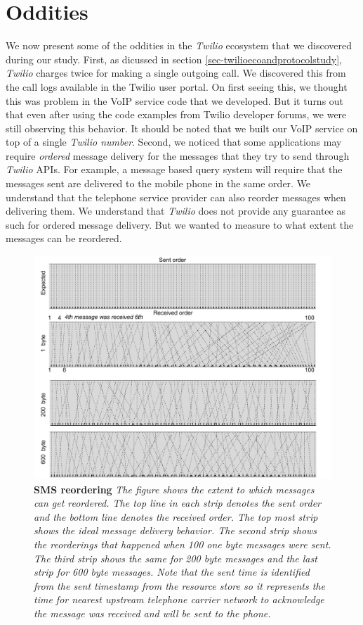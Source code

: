 \section{Oddities}
\label{sec-oddities}

We now present some of the oddities in the \textit{Twilio} ecosystem that we discovered during our study. First, as dicussed in section \ref{sec-twilioecoandprotocolstudy}, \textit{Twilio} charges twice for making a single outgoing call. We discovered this from the call logs available in the Twilio user portal. On first seeing this, we thought this was problem in the VoIP service code that we developed. But it turns out that even after using the code examples from Twilio developer forums, we were still observing this behavior. It should be noted that we built our VoIP service on top of a single \textit{Twilio number}. Second, we noticed that some applications may require \textit{ordered} message delivery for the messages that they try to send through \textit{Twilio} APIs. For example, a message based query system will require that the messages sent are delivered to the mobile phone in the same order. We understand that the telephone service provider can also reorder messages when delivering them. We understand that \textit{Twilio} does not provide any guarantee as such for ordered message delivery. But we wanted to measure to what extent the messages can be reordered. 

\begin{figure}[t!] \centering
\includegraphics[width=\textwidth]{figs/reordering.pdf}
\caption{\textbf{SMS reordering} {\footnotesize\textit{
The figure shows the extent to which messages can get reordered. The top line in each strip denotes the sent order and the bottom line denotes the received order. The top most strip shows the ideal message delivery behavior. The second strip shows the reorderings that happened when 100 one byte messages were sent. The third strip shows the same for 200 byte messages and the last strip for 600 byte messages. Note that the sent time is identified from the \textit{sent timestamp} from the resource store so it represents the time for nearest upstream telephone carrier network to acknowledge the message was received and will be sent to the phone. 
}}}
\label{fig:reordering}
\end{figure}


